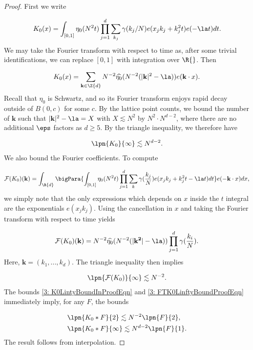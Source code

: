 \documentclass[11pt]{amsart}
\begin{document}
\begin{proof}
    First we write

    \begin{equation*}
        K_0(x) = \int_{[0,1]}\eta_0(N^2t)\prod_{j=1}^d\sum_{k_j}\gamma(k_j/N)e(x_jk_j+k_j^2t)e(-\la t)dt.
    \end{equation*}
    We may take the Fourier transform with respect to time as, after some trivial identifications, we can replace $[0,1]$ with integration over $\R{}$. Then

    \begin{equation*}
        K_0(x) = \sum_{\mathbf{k}\in\Z{d}}N^{-2}\widehat{\eta_0}(N^{-2}(|\mathbf{k}|^2-\la))e(\mathbf{k}\cdot x).
    \end{equation*}
    Recall that $\eta_0$ is Schwartz, and so its Fourier transform enjoys rapid decay outside of $B(0,c)$ for some $c$. By the lattice point counts, we bound the number of $\mathbf{k}$ such that $|\mathbf{k}|^2-\la=X$ with $X\lesssim N^2$ by $N^2\cdot N^{d-2}$, where there are no additional $\eps$ factors as $d\geq 5$. By the triangle inequality, we therefore have

    \begin{equation}\label{3: K0LintyBoundInProofEqn}
        \lpn{K_0}{\infty}\lesssim N^{d-2}.
    \end{equation}
    We also bound the Fourier coefficients. To compute

    \begin{equation*}
        \mathcal{F}(K_0)(\mathbf{k}) = \int_{\R{d}}\bigPara{\int_{[0,1]}\eta_0(N^2t)\prod_{j=1}^d\sum_{k}\gamma(\frac{k_j}{N})e(x_jk_j+k_j^2t-\la t)dt}e(-\mathbf{k}\cdot x)dx,
    \end{equation*}
    we simply note that the only expressions which depends on $x$ inside the $t$ integral are the exponentials $e(x_jk_j)$. Using the cancellation in $x$ and taking the Fourier transform with respect to time yields

    \begin{equation*}
        \mathcal{F}(K_0)(\mathbf{k}) = N^{-2}\widehat{\eta_0}(N^{-2}(|\mathbf{k^2}|-\la))\prod_{j=1}^d\gamma(\frac{k_i}{N}).
    \end{equation*}
    Here, $\mathbf{k} = (k_1,...,k_d)$. The triangle inequality then implies

    \begin{equation}\label{3: FTK0LinftyBoundProofEqn}
        \lpn{\mathcal{F}(K_0)}{\infty}\lesssim N^{-2}.
    \end{equation}
    The bounds \eqref{3: K0LintyBoundInProofEqn} and \eqref{3: FTK0LinftyBoundProofEqn} immediately imply, for any $F$, the bounds

    \begin{align*}
        &\lpn{K_0*F}{2}\lesssim N^{-2}\lpn{F}{2},\\
        &\lpn{K_0*F}{\infty}\lesssim N^{d-2}\lpn{F}{1}.
    \end{align*}
    The result follows from interpolation.
\end{proof}
\end{document}

